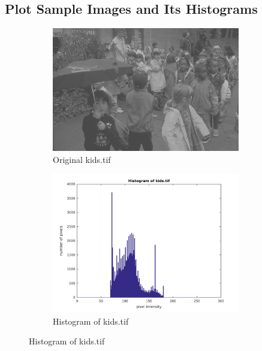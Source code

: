 \documentclass{article}
\begin{document}
\subsection{Plot Sample Images and Its Histograms}
	\begin{figure}[h]
		\begin{subfigure}{0.5\textwidth}
			\includegraphics[width=0.9\textwidth]{kids.png}
			\caption{Original kids.tif}
		\end{subfigure}
		\begin{subfigure}{0.5\textwidth}
			\includegraphics[width=0.9\textwidth]{kids_hist.png}
			\caption{Histogram of kids.tif}
		\end{subfigure}
	\end{figure}
\end{document}
